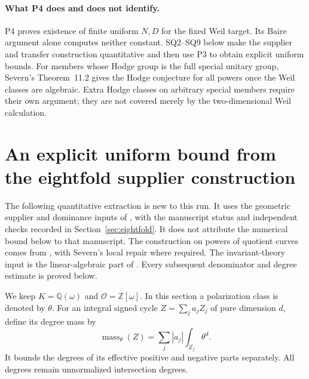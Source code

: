 \documentclass[11pt,a4paper]{article}
\theoremstyle{definition}\newtheorem{definition}[theorem]{Definition}
\theoremstyle{remark}\newtheorem{remark}[theorem]{Remark}
\newcommand{\Q}{\mathbb Q}\newcommand{\Z}{\mathbb Z}\newcommand{\C}{\mathbb C}\newcommand{\R}{\mathbb R}
\newcommand{\cO}{\mathcal O}\newcommand{\CH}{\operatorname{CH}}\newcommand{\cl}{\operatorname{cl}}
\begin{document}
\paragraph{What P4 does and does not identify.}
P4 proves existence of finite uniform $N,D$ for the fixed Weil target. Its Baire argument alone computes neither constant. SQ2--SQ9 below make the supplier and transfer construction quantitative and then use P3 to obtain explicit uniform bounds. For members whose Hodge group is the full special unitary group, Severn's Theorem~11.2 gives the Hodge conjecture for all powers once the Weil classes are algebraic. Extra Hodge classes on arbitrary special members require their own argument; they are not covered merely by the two-dimensional Weil calculation.


\section{An explicit uniform bound from the eightfold supplier construction}
\label{sec:eightfold-quantitative}

The following quantitative extraction is new to this run. It uses the geometric supplier and dominance inputs of \citet{Severn26}, with the manuscript status and independent checks recorded in Section~\ref{sec:eightfold}. It does not attribute the numerical bound below to that manuscript. The construction on powers of quotient curves comes from \citet[Theorem~2.0 and Lemmas~2.3--2.6]{Schoen88}, with Severn's local repair where required. The invariant-theory input is the linear-algebraic part of \citet[Lemma~3.5, Proposition~3.6, and Remark~3.7]{Milne99}. Every subsequent denominator and degree estimate is proved below.

We keep $K=\Q(\omega)$ and $\cO=\Z[\omega]$. In this section a polarization class is denoted by $\theta$. For an integral signed cycle $Z=\sum_j a_jZ_j$ of pure dimension $d$, define its degree mass by
\[
 \operatorname{mass}_\theta(Z)=\sum_j|a_j|\int_{Z_j}\theta^d.
\]
It bounds the degrees of its effective positive and negative parts separately. All degrees remain unnormalized intersection degrees.
\end{document}
